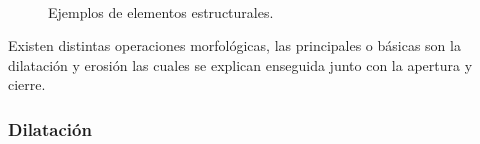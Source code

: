 \begin{figure}[h!]
\centering
{} %
\qquad
{} 
\\
\caption{Ejemplos de elementos estructurales.} \label{fig:EX}
\end{figure} 

Existen distintas operaciones morfológicas, las principales o básicas son la dilatación y erosión las cuales se explican enseguida junto con la apertura y cierre. 
 
\subsubsection{Dilatación}\label{sssec:Dilatation}

